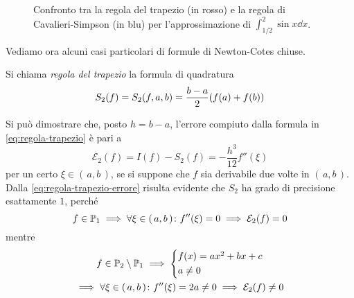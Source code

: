 	\begin{figure}[tpb]
		\centering
		
		\caption{Confronto tra la regola del trapezio (in rosso) e la regola di Cavalieri-Simpson (in blu) per l'approssimazione di \(\int_{1 / 2}^2 \sin x \dd{x}\).}
	\end{figure}

	Vediamo ora alcuni casi particolari di formule di Newton-Cotes chiuse.
	
	\begin{definizione}\label{def:regola-trapezio}
		Si chiama \emph{regola del trapezio} la formula di quadratura
		\begin{equation}\label{eq:regola-trapezio}
			S_2 (f) = S_2 (f, a, b) = \frac{b - a}{2} \qty(f (a) + f (b))
		\end{equation}
	\end{definizione}

	Si può dimostrare che, posto \(h = b - a\), l'errore compiuto dalla formula in \eqref{eq:regola-trapezio} è pari a
	\begin{equation}\label{eq:regola-trapezio-errore}
		\mathcal{E}_2 (f) = I (f) - S_2 (f) = - \frac{h^3}{12} f'' (\xi)
	\end{equation}
	per un certo \(\xi \in (\, a, b \,)\), se si suppone che \(f\) sia derivabile due volte in \((\, a, b \,)\). Dalla \eqref{eq:regola-trapezio-errore} risulta evidente che \(S_2\) ha grado di precisione esattamente \(1\), perché
	\begin{equation*}
		f \in \P_1 \implies \forall \xi \in (\, a, b \,) \colon f'' (\xi) = 0 \implies \mathcal{E}_2 (f) = 0
	\end{equation*}
	mentre
	\begin{multline*}
		f \in \P_2 \setminus \P_1 \implies
		\begin{cases*}
			f (x) = a x^2 + b x + c \\
			a \ne 0
		\end{cases*} \\
		\implies \forall \xi \in (\, a, b \,) \colon f'' (\xi) = 2 a \ne 0 \implies \mathcal{E}_2 (f) \ne 0
	\end{multline*}

